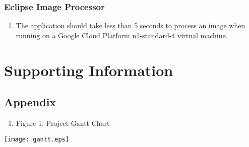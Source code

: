 \documentclass[10pt, onecolumn, draftclsnofoot, letterpaper, compsoc]{IEEEtran}
\begin{document}
\subsubsection{Eclipse Image Processor}
	\begin{enumerate}
		\item The application should take less than 5 seconds to process an
		 image when running on a Google Cloud Platform n1-standard-4 virtual
		 machine.
	\end{enumerate}

\newpage
\section{Supporting Information}

\subsection{Appendix}

\begin{enumerate}
	\item Figure 1. Project Gantt Chart 
\end{enumerate}

\begin{center}
	\texttt{[image: gantt.eps]}
\end{center}
\end{document}
